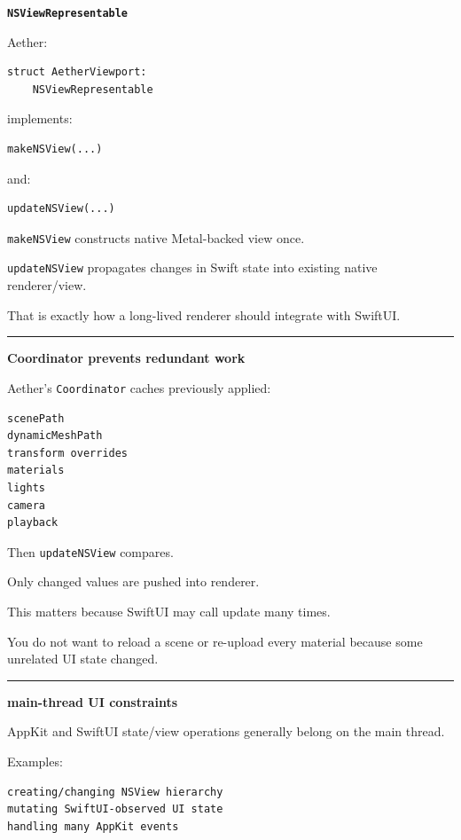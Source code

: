 \textbf{\texttt{NSViewRepresentable}}

Aether:

\begin{verbatim}
struct AetherViewport:
    NSViewRepresentable
\end{verbatim}

implements:

\begin{verbatim}
makeNSView(...)
\end{verbatim}

and:

\begin{verbatim}
updateNSView(...)
\end{verbatim}

\texttt{makeNSView} constructs native Metal-backed view once.

\texttt{updateNSView} propagates changes in Swift state into existing native renderer/view.

That is exactly how a long-lived renderer should integrate with SwiftUI.

\begin{center}\rule{0.5\linewidth}{0.5pt}\end{center}

\textbf{Coordinator prevents redundant work}

Aether's \texttt{Coordinator} caches previously applied:

\begin{verbatim}
scenePath
dynamicMeshPath
transform overrides
materials
lights
camera
playback
\end{verbatim}

Then \texttt{updateNSView} compares.

Only changed values are pushed into renderer.

This matters because SwiftUI may call update many times.

You do not want to reload a scene or re-upload every material because some unrelated UI state changed.

\begin{center}\rule{0.5\linewidth}{0.5pt}\end{center}

\textbf{main-thread UI constraints}

AppKit and SwiftUI state/view operations generally belong on the main thread.

Examples:

\begin{verbatim}
creating/changing NSView hierarchy
mutating SwiftUI-observed UI state
handling many AppKit events
\end{verbatim}


